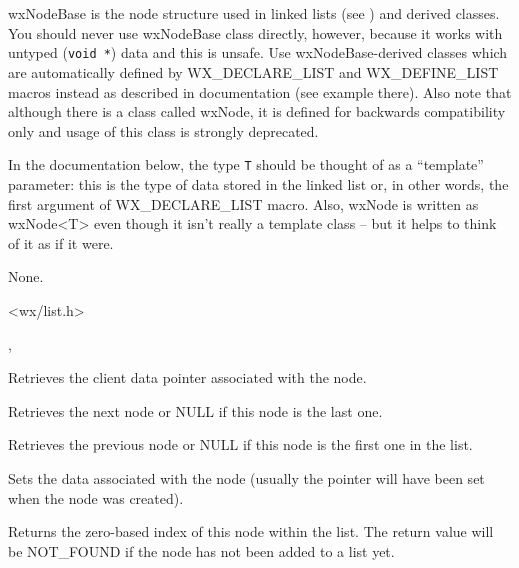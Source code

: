 \section{}\label{wxnode}

wxNodeBase is the node structure used in linked lists (see 
) and derived classes. You should never use wxNodeBase
class directly, however, because it works with untyped ({\tt void *}) data and
this is unsafe. Use wxNodeBase-derived classes which are automatically defined
by WX\_DECLARE\_LIST and WX\_DEFINE\_LIST macros instead as described in
 documentation (see example there). Also note that
although there is a class called wxNode, it is defined for backwards
compatibility only and usage of this class is strongly deprecated.

In the documentation below, the type {\tt T} should be thought of as a
``template'' parameter: this is the type of data stored in the linked list or,
in other words, the first argument of WX\_DECLARE\_LIST macro. Also, wxNode is
written as wxNode<T> even though it isn't really a template class -- but it
helps to think of it as if it were.


None.


<wx/list.h>


, 




Retrieves the client data pointer associated with the node.



Retrieves the next node or NULL if this node is the last one.



Retrieves the previous node or NULL if this node is the first one in the list.



Sets the data associated with the node (usually the pointer will have been
set when the node was created).



Returns the zero-based index of this node within the list. The return value
will be NOT\_FOUND if the node has not been added to a list yet.

